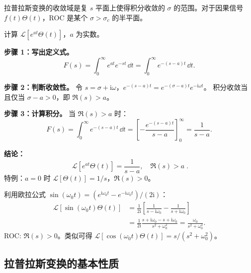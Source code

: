 拉普拉斯变换的收敛域是复 $s$ 平面上使得积分收敛的 $\sigma$ 的范围。对于因果信号 $f(t)\Theta(t)$，ROC 是某个 $\sigma > \sigma_c$ 的半平面。

\begin{example}
计算 $\mathcal{L}[e^{at}\Theta(t)]$，$a$ 为实数。

\textbf{步骤 1：写出定义式。}
\begin{equation}
F(s) = \int_0^{\infty} e^{at} e^{-st}\,\dd t
= \int_0^{\infty} e^{-(s-a)t}\,\dd t.
\end{equation}

\textbf{步骤 2：判断收敛性。}
令 $s = \sigma + \mathrm{i}\omega$，$e^{-(s-a)t} = e^{-(\sigma-a)t}e^{-\mathrm{i}\omega t}$。
积分收敛当且仅当 $\sigma - a > 0$，即 $\Re(s) > a$。

\textbf{步骤 3：计算积分。}
当 $\Re(s) > a$ 时：
\begin{equation}
F(s) = \int_0^{\infty} e^{-(s-a)t}\,\dd t
= \left[-\frac{e^{-(s-a)t}}{s-a}\right]_0^{\infty}
= \frac{1}{s-a}.
\end{equation}

\textbf{结论：}
\begin{equation}
\boxed{\;\mathcal{L}[e^{at}\Theta(t)] = \frac{1}{s-a},\quad \Re(s) > a\;}.
\end{equation}
特例：$a=0$ 时 $\mathcal{L}[\Theta(t)] = 1/s$，$\Re(s) > 0$。
\end{example}

\begin{example}
利用欧拉公式 $\sin(\omega_0 t) = (e^{\mathrm{i}\omega_0 t} - e^{-\mathrm{i}\omega_0 t})/(2\mathrm{i})$：
\begin{align*}
\mathcal{L}[\sin(\omega_0 t)\Theta(t)]
&= \frac{1}{2\mathrm{i}}\left[\frac{1}{s-\mathrm{i}\omega_0} - \frac{1}{s+\mathrm{i}\omega_0}\right] \\
&= \frac{1}{2\mathrm{i}}\frac{s+\mathrm{i}\omega_0 - s + \mathrm{i}\omega_0}{s^2 + \omega_0^2}
= \frac{\omega_0}{s^2 + \omega_0^2}.
\end{align*}
ROC: $\Re(s) > 0$。类似可得 $\mathcal{L}[\cos(\omega_0 t)\Theta(t)] = s/(s^2+\omega_0^2)$。
\end{example}

\subsection{拉普拉斯变换的基本性质}

